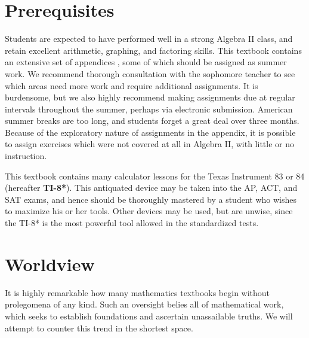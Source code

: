 \section{Prerequisites}
  
Students are expected to have performed well in a strong Algebra II class, and retain excellent
arithmetic, graphing, and factoring skills.  This textbook contains an extensive set of appendices 
, some of which should
be assigned as summer work.  We recommend thorough consultation with the sophomore teacher
to see which areas need more work and require additional assignments.  It is burdensome, but we
also highly recommend making assignments due at regular intervals throughout the summer, perhaps
via electronic submission.
American summer breaks are too long, and students forget a great
deal over three months.  Because of the exploratory nature of assignments in the appendix, it is
possible to assign exercises which were not covered at all in Algebra II, with little or no instruction.


This textbook contains many calculator lessons for the Texas Instrument 83 or 84 (hereafter \textbf{TI-8*}).
This antiquated device may be taken into the AP, ACT, and SAT exams, and hence 
should be thoroughly mastered by a student who wishes to maximize his or her tools.  Other
devices may be used, but are unwise, since the TI-8* is the most powerful tool allowed in the 
standardized tests.



\section{Worldview}

It is highly remarkable how many  mathematics textbooks begin without  
prolegomena of any kind.  Such an oversight belies all of mathematical work, which seeks 
to establish foundations and ascertain unassailable truths.  We will attempt to counter this trend
in the shortest space.


